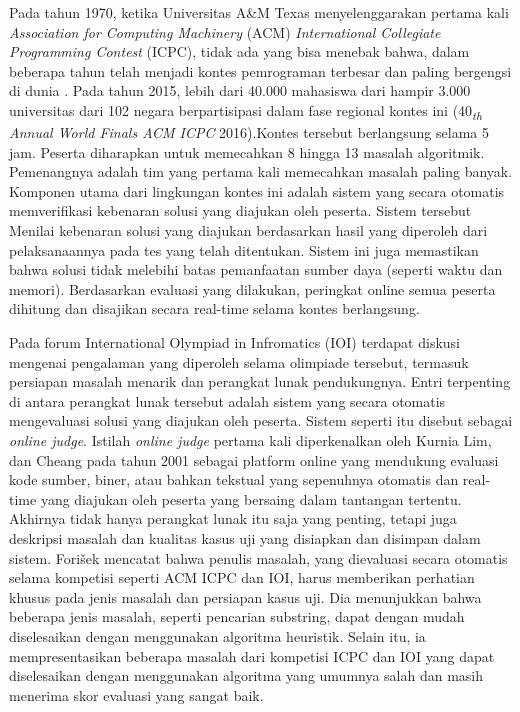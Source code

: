 \documentclass[a4paper,twoside]{article}
\begin{document}
Pada tahun 1970, ketika Universitas A\&M Texas  menyelenggarakan pertama kali \textit{Association for Computing Machinery} (ACM) \textit{International Collegiate Programming Contest}  (ICPC), tidak ada yang bisa menebak bahwa, dalam beberapa tahun telah menjadi kontes pemrograman terbesar dan paling bergengsi di dunia \cite{judge_survey2018}. Pada tahun 2015, lebih dari 40.000 mahasiswa dari hampir 3.000 universitas dari 102 negara berpartisipasi dalam fase regional kontes ini (40\textit{\textsubscript{th} Annual World Finals ACM ICPC }2016).Kontes tersebut berlangsung selama 5 jam. Peserta diharapkan untuk memecahkan 8 hingga 13 masalah algoritmik. Pemenangnya adalah tim yang pertama kali memecahkan masalah paling banyak. Komponen utama dari lingkungan kontes ini adalah sistem yang secara otomatis memverifikasi kebenaran solusi yang diajukan oleh peserta. Sistem tersebut Menilai kebenaran solusi yang diajukan berdasarkan hasil yang diperoleh dari pelaksanaannya pada tes yang telah ditentukan. Sistem ini juga memastikan bahwa solusi tidak melebihi batas pemanfaatan sumber daya (seperti waktu dan memori). Berdasarkan evaluasi yang dilakukan, peringkat online semua peserta dihitung dan disajikan secara real-time selama kontes berlangsung. 

Pada forum International Olympiad in Infromatics (IOI) terdapat diskusi mengenai pengalaman yang diperoleh selama olimpiade tersebut, termasuk persiapan masalah menarik dan perangkat lunak pendukungnya. Entri terpenting di antara perangkat lunak tersebut adalah sistem yang secara otomatis mengevaluasi solusi yang diajukan oleh peserta. Sistem seperti itu disebut sebagai \textit{online judge}. Istilah \textit{online judge} pertama kali diperkenalkan oleh Kurnia Lim, dan Cheang pada tahun 2001 sebagai platform online yang mendukung evaluasi kode sumber, biner, atau bahkan tekstual yang sepenuhnya otomatis dan real-time yang diajukan oleh peserta yang bersaing dalam tantangan tertentu. Akhirnya tidak hanya perangkat lunak itu saja yang penting, tetapi juga deskripsi masalah dan kualitas kasus uji yang disiapkan dan disimpan dalam sistem. Forišek mencatat bahwa penulis masalah, yang dievaluasi secara otomatis selama kompetisi seperti ACM ICPC dan IOI, harus memberikan perhatian khusus pada jenis masalah dan persiapan kasus uji. Dia menunjukkan bahwa beberapa jenis masalah, seperti pencarian substring, dapat dengan mudah diselesaikan dengan menggunakan algoritma heuristik. Selain itu, ia mempresentasikan beberapa masalah dari kompetisi ICPC dan IOI yang dapat diselesaikan dengan menggunakan algoritma yang umumnya salah dan masih menerima skor evaluasi yang sangat baik. 
\end{document}
